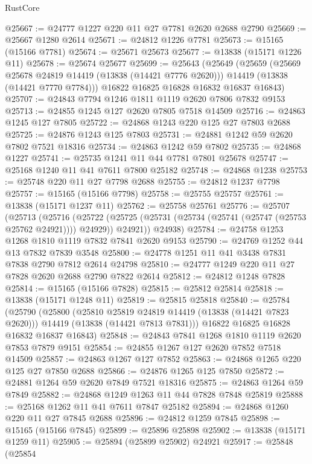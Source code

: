\begin{lexlean}{RustCore}
\begin{coremodule}
@25667 := @24777 @1227 @220 @11 @27 @7781 @2620 @2688 @2790
@25669 := @25667 @1280 @2614
@25671 := @24812 @1226 @7781
@25673 := @15165 (@15166 @7781)
@25674 := @25671 @25673
@25677 := @13838 (@15171 @1226 @11)
@25678 := @25674 @25677
@25699 := @25643
    (@25649
      (@25659
        (@25669 @25678 @24819 @14419 (@13838 (@14421 @7776 @2620)))
        @14419
        (@13838 (@14421 @7770 @7784)))
      @16822
      @16825
      @16828
      @16832
      @16837
      @16843)
@25707 := @24843 @7794 @1246 @1811 @1119 @2620 @7806 @7832 @9153
@25713 := @24855 @1245 @127 @2620 @7805 @7518 @14509
@25716 := @24863 @1245 @127 @7805
@25722 := @24868 @1243 @220 @125 @27 @7803 @2688
@25725 := @24876 @1243 @125 @7803
@25731 := @24881 @1242 @59 @2620 @7802 @7521 @18316
@25734 := @24863 @1242 @59 @7802
@25735 := @24868 @1227
@25741 := @25735 @1241 @11 @44 @7781 @7801 @25678
@25747 := @25168 @1240 @11 @41 @7611 @7800 @25182
@25748 := @24868 @1238
@25753 := @25748 @220 @11 @27 @7798 @2688
@25755 := @24812 @1237 @7798
@25757 := @15165 (@15166 @7798)
@25758 := @25755 @25757
@25761 := @13838 (@15171 @1237 @11)
@25762 := @25758 @25761
@25776 := @25707
    (@25713
      (@25716
        (@25722 (@25725 (@25731 (@25734 (@25741 (@25747 (@25753 @25762 @24921)))) @24929)) @24921))
      @24938)
@25784 := @24758 @1253 @1268 @1810 @1119 @7832 @7841 @2620 @9153
@25790 := @24769 @1252 @44 @13 @7832 @7839 @3548
@25800 := @24778 @1251 @11 @41 @3438 @7831 @7838 @2790 @7812 @2614 @24798
@25810 := @24777 @1249 @220 @11 @27 @7828 @2620 @2688 @2790 @7822 @2614
@25812 := @24812 @1248 @7828
@25814 := @15165 (@15166 @7828)
@25815 := @25812 @25814
@25818 := @13838 (@15171 @1248 @11)
@25819 := @25815 @25818
@25840 := @25784
    (@25790
      (@25800
        (@25810 @25819 @24819 @14419 (@13838 (@14421 @7823 @2620)))
        @14419
        (@13838 (@14421 @7813 @7831)))
      @16822
      @16825
      @16828
      @16832
      @16837
      @16843)
@25848 := @24843 @7841 @1268 @1810 @1119 @2620 @7853 @7879 @9151
@25854 := @24855 @1267 @127 @2620 @7852 @7518 @14509
@25857 := @24863 @1267 @127 @7852
@25863 := @24868 @1265 @220 @125 @27 @7850 @2688
@25866 := @24876 @1265 @125 @7850
@25872 := @24881 @1264 @59 @2620 @7849 @7521 @18316
@25875 := @24863 @1264 @59 @7849
@25882 := @24868 @1249 @1263 @11 @44 @7828 @7848 @25819
@25888 := @25168 @1262 @11 @41 @7611 @7847 @25182
@25894 := @24868 @1260 @220 @11 @27 @7845 @2688
@25896 := @24812 @1259 @7845
@25898 := @15165 (@15166 @7845)
@25899 := @25896 @25898
@25902 := @13838 (@15171 @1259 @11)
@25905 := @25894 (@25899 @25902) @24921
@25917 := @25848
    (@25854

\end{coremodule}
\end{lexlean}
